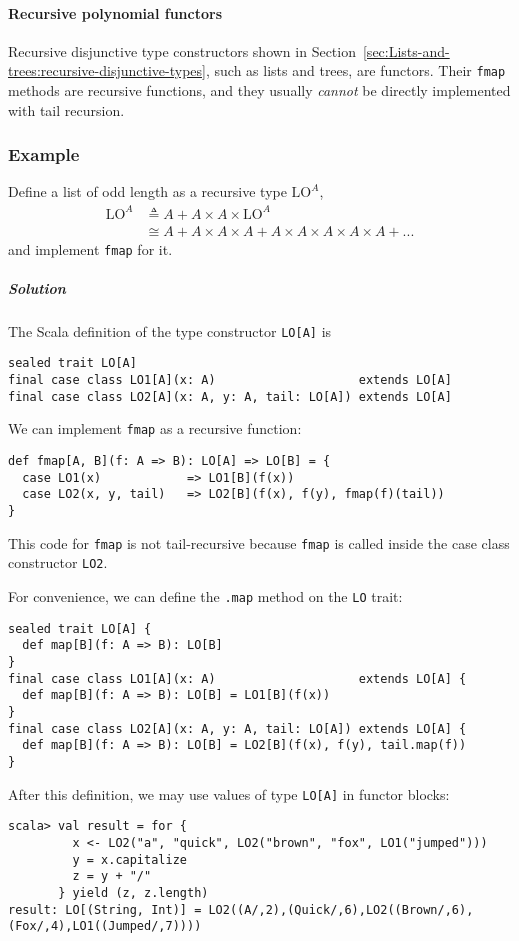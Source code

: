 \paragraph{Recursive polynomial functors}

Recursive disjunctive type constructors shown in Section~\ref{sec:Lists-and-trees:recursive-disjunctive-types},
such as lists and trees, are functors. Their \lstinline!fmap! methods
are recursive functions, and they usually \emph{cannot} be directly
implemented with tail recursion. 

\subsubsection{Example }

Define a list of odd length as a recursive type $\text{LO}^{A}$,
\begin{align}
\text{LO}^{A} & \triangleq A+A\times A\times\text{LO}^{A}\label{eq:f-lo-def}\\
 & \cong A+A\times A\times A+A\times A\times A\times A\times A+...\nonumber 
\end{align}
and implement \lstinline!fmap! for it.

\subparagraph{Solution}

The Scala definition of the type constructor \lstinline!LO[A]! is

\begin{lstlisting}
sealed trait LO[A]
final case class LO1[A](x: A)                    extends LO[A]
final case class LO2[A](x: A, y: A, tail: LO[A]) extends LO[A]
\end{lstlisting}

We can implement \lstinline!fmap! as a recursive function:
\begin{lstlisting}
def fmap[A, B](f: A => B): LO[A] => LO[B] = {
  case LO1(x)            => LO1[B](f(x))
  case LO2(x, y, tail)   => LO2[B](f(x), f(y), fmap(f)(tail))
}
\end{lstlisting}
This code for \lstinline!fmap! is not tail-recursive because \lstinline!fmap!
is called inside the case class constructor \lstinline!LO2!. 

For convenience, we can define the \lstinline!.map! method on the
\lstinline!LO! trait:
\begin{lstlisting}
sealed trait LO[A] {
  def map[B](f: A => B): LO[B]
}
final case class LO1[A](x: A)                    extends LO[A] {
  def map[B](f: A => B): LO[B] = LO1[B](f(x))
}
final case class LO2[A](x: A, y: A, tail: LO[A]) extends LO[A] {
  def map[B](f: A => B): LO[B] = LO2[B](f(x), f(y), tail.map(f))
}
\end{lstlisting}
After this definition, we may use values of type \lstinline!LO[A]!
in functor blocks:
\begin{lstlisting}
scala> val result = for {
         x <- LO2("a", "quick", LO2("brown", "fox", LO1("jumped")))
         y = x.capitalize
         z = y + "/"
       } yield (z, z.length)
result: LO[(String, Int)] = LO2((A/,2),(Quick/,6),LO2((Brown/,6),(Fox/,4),LO1((Jumped/,7))))
\end{lstlisting}

